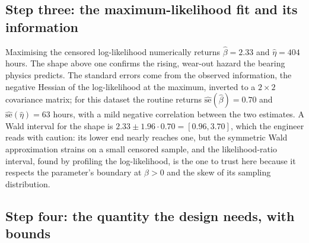 

\subsection{Step three: the maximum-likelihood fit and its information}

Maximising the censored log-likelihood numerically returns
$\hat{\beta} = 2.33$ and $\hat{\eta} = 404$ hours. The shape above one
confirms the rising, wear-out hazard the bearing physics predicts. The
standard errors come from the observed information, the negative
Hessian of the log-likelihood at the maximum, inverted to a $2\times2$
covariance matrix; for this dataset the routine returns
$\widehat{\mathrm{se}}(\hat{\beta}) = 0.70$ and
$\widehat{\mathrm{se}}(\hat{\eta}) = 63$ hours, with a mild negative
correlation between the two estimates. A Wald interval for the shape
is $2.33 \pm 1.96 \cdot 0.70 = [0.96, 3.70]$, which the engineer reads
with caution: its lower end nearly reaches one, but the symmetric Wald
approximation strains on a small censored sample, and the
likelihood-ratio interval, found by profiling the log-likelihood, is
the one to trust here because it respects the parameter's boundary at
$\beta > 0$ and the skew of its sampling distribution.

\subsection{Step four: the quantity the design needs, with bounds}

